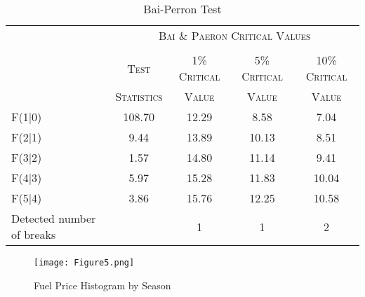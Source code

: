 \documentclass[12pt]{article}
\begin{document}
\begin{table}[htbp]\centering
\def\sym#1{\ifmmode^{#1}\else\(^{#1}\)\fi}
\caption{Bai-Perron Test}
\renewcommand{\arraystretch}{0.7}
\begin{tabular}{l*{4}{c}}
\toprule
 & \multicolumn{4}{c}{\textsc{Bai \& Paeron Critical Values}} \\ 
                                          \cline{2-5}  \\
                  &\multicolumn{1}{c}{\textsc{Test}}&\multicolumn{1}{c}{\textsc{1\% Critical}}&\multicolumn{1}{c}{\textsc{5\% Critical}}&\multicolumn{1}{c}{\textsc{10\% Critical}}\\             
                &\multicolumn{1}{c}{\textsc{Statistics}}&\multicolumn{1}{c}{\textsc{Value}}&\multicolumn{1}{c}{\textsc{Value}}&\multicolumn{1}{c}{\textsc{Value}}\\    


\hline \hline
\addlinespace
F(1|0)            &      108.70 &      12.29&      8.58 & 7.04\\

\addlinespace
F(2|1)                   &     9.44&      13.89&    10.13 &  8.51 \\

\addlinespace
F(3|2)                   &      1.57 &       14.80         &      11.14   & 9.41  \\

\addlinespace
F(4|3)                   &       5.97  &       15.28  &     11.83  &  10.04 \\

\addlinespace
F(5|4)               &      3.86         &      15.76&      12.25  &  10.58  \\

\midrule
Detected number of breaks   &   &    1 &    1 &    2  \\  
\midrule
\hline \hline
\end{tabular}
\end{table}







\begin{figure}[htbp] 
    \centering
            \caption{Fuel Price Histogram by Season}
        \texttt{[image: Figure5.png]}
        \label{fig:88mono}
\end{figure}
\end{document}
